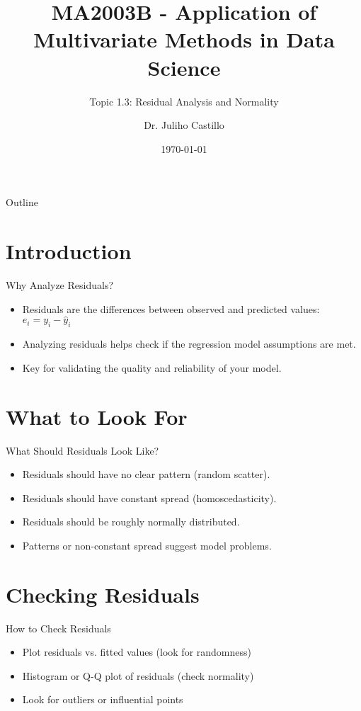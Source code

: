 \documentclass[aspectratio=169]{beamer}
\title[Residual Analysis \& Normality]{MA2003B - Application of Multivariate Methods in Data Science}
\subtitle{Topic 1.3: Residual Analysis and Normality}
\author{Dr. Juliho Castillo}
\institute{Tec de Monterrey}
\date{\today}
\begin{document}
\begin{frame}
  \titlepage
\end{frame}

\begin{frame}{Outline}
  \tableofcontents
\end{frame}

\section{Introduction}
\begin{frame}{Why Analyze Residuals?}
  \begin{itemize}
    \item Residuals are the differences between observed and predicted values: $e_i = y_i - \hat{y}_i$
    \item Analyzing residuals helps check if the regression model assumptions are met.
    \item Key for validating the quality and reliability of your model.
  \end{itemize}
\end{frame}

\section{What to Look For}
\begin{frame}{What Should Residuals Look Like?}
  \begin{itemize}
    \item Residuals should have no clear pattern (random scatter).
    \item Residuals should have constant spread (homoscedasticity).
    \item Residuals should be roughly normally distributed.
    \item Patterns or non-constant spread suggest model problems.
  \end{itemize}
\end{frame}

\section{Checking Residuals}
\begin{frame}{How to Check Residuals}
  \begin{itemize}
    \item Plot residuals vs. fitted values (look for randomness)
    \item Histogram or Q-Q plot of residuals (check normality)
    \item Look for outliers or influential points
  \end{itemize}
\end{frame}
\end{document}
